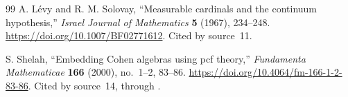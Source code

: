 \documentclass[11pt,letterpaper]{article}
\numberwithin{equation}{section}
\theoremstyle{definition}
\theoremstyle{remark}
\begin{document}
\begin{thebibliography}{99}
A. L\'evy and R. M. Solovay, ``Measurable cardinals and the continuum
hypothesis,'' \emph{Israel Journal of Mathematics} \textbf{5} (1967), 234--248.
\url{https://doi.org/10.1007/BF02771612}. Cited by source~11.

S. Shelah, ``Embedding Cohen algebras using pcf theory,'' \emph{Fundamenta
Mathematicae} \textbf{166} (2000), no.~1--2, 83--86.
\url{https://doi.org/10.4064/fm-166-1-2-83-86}. Cited by source~14, through
\cite[Corollary~4.21]{FKW}.

\end{thebibliography}
\end{document}
